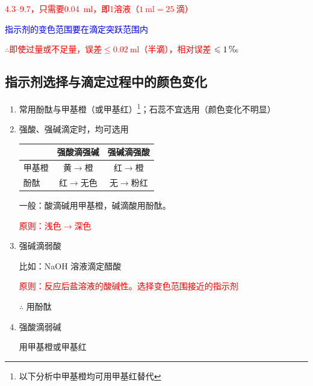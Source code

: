         \textcolor{red}{\numrange{4.3}{9.7}，只需要\SI{0.04}{\milli\litre}，即\SI{1}{}溶液（\(\SI{1}{\milli\litre}=\SI{25}{\text{滴}}\)）}

        \textcolor{blue}{指示剂的变色范围要在滴定突跃范围内}

        \textcolor{red}{\(\therefore\)即使过量或不足量，\(\text{误差} \leq \SI{0.02}{\milli\litre}\)（半滴），相对误差 \(\leq \SI{1}{\text{\textperthousand}}\)}

    \subsection{指示剂选择与滴定过程中的颜色变化}\label{subsec:指示剂选择与滴定过程中的颜色变化}

        \begin{enumerate}
            \item 常用酚酞与甲基橙（或甲基红）\footnote{以下分析中甲基橙均可用甲基红替代}；石蕊不宜选用（颜色变化不明显）
            \item 强酸、强碱滴定时，均可选用
            
            \begin{center}
            \begin{tabular}{@{}lcc@{}}
            \toprule
            & 强酸滴强碱 & 强碱滴强酸 \\
            \midrule
            甲基橙 & 黄\(\to\)橙 & 红\(\to\)橙 \\
            酚酞   & 红\(\to\)无色 & 无\(\to\)粉红 \\
            \bottomrule
            \end{tabular}
            \end{center}
            
            一般：酸滴碱用甲基橙，碱滴酸用酚酞。

            \textcolor{red}{原则：浅色\(\to\)深色}

            \item 强碱滴弱酸
            
            比如：NaOH 溶液滴定醋酸

            \textcolor{red}{原则：反应后盐溶液的酸碱性。选择变色范围接近的指示剂}

            \( \therefore \) 用酚酞

            \item 强酸滴弱碱
            
            用甲基橙或甲基红

        \end{enumerate}

